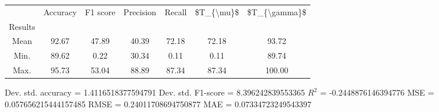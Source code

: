 \begin{tabular}{|c|c|c|c|c|c|c|}
\toprule
{} &  Accuracy &  F1 score &  Precision &  Recall &  \$T\_\{\textbackslash mu\}\$ &  \$T\_\{\textbackslash gamma\}\$ \\
Results &           &           &            &         &            &               \\
\hline
Mean    &     92.67 &     47.89 &      40.39 &   72.18 &      72.18 &         93.72 \\
Min.    &     89.62 &      0.22 &      30.34 &    0.11 &       0.11 &         89.74 \\
Max.    &     95.73 &     53.04 &      88.89 &   87.34 &      87.34 &        100.00 \\
\bottomrule
\end{tabular}

 Dev. std. accuracy = 1.4116518377594791
 Dev. std. F1-score = 8.396242839553365
 $R^2$ = -0.2448876146394776
 MSE = 0.057656215444157485
 RMSE = 0.24011708694750877
 MAE = 0.07334723249543397